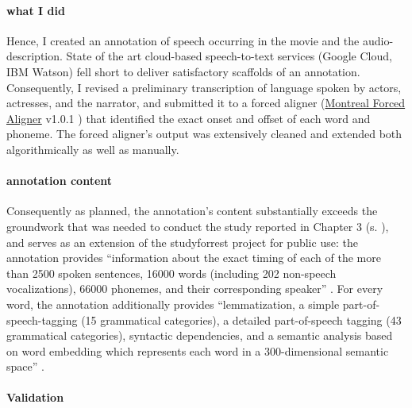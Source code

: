 \paragraph{what I did}
Hence, I created an annotation of speech occurring in the movie and the
audio-description.
State of the art cloud-based speech-to-text services (Google Cloud, IBM Watson)
fell short to deliver satisfactory scaffolds of an annotation.
Consequently, I revised a preliminary transcription of language spoken by
actors, actresses, and the narrator, and submitted it to a forced aligner
(\href{https://github.com/MontrealCorpusTools/Montreal-Forced-Aligner}{Montreal
Forced Aligner} v1.0.1 \citep{mcauliffe2017montreal}) that identified the exact
onset and offset of each word and phoneme. The forced aligner's output was
extensively cleaned and extended both algorithmically as well as manually.


\paragraph{annotation content}
%
Consequently as planned, the annotation's content substantially exceeds the
groundwork that was needed to conduct the study reported in Chapter 3 (s.
\citep{haeusler2022processing}), and serves as an extension of the studyforrest
project for public use:
the annotation provides ``information about the exact timing of each of the more than 2500
spoken sentences, 16000 words (including 202 non-speech vocalizations), 66000
phonemes, and their corresponding speaker'' \citep{haeusler2021speechanno}.
%
For every word, the annotation additionally provides ``lemmatization, a simple
part-of-speech-tagging (15 grammatical categories), a detailed part-of-speech
tagging (43 grammatical categories), syntactic dependencies, and a semantic
analysis based on word embedding which represents each word in a 300-dimensional
semantic space'' \citep{haeusler2021speechanno}.


\paragraph{Validation}


